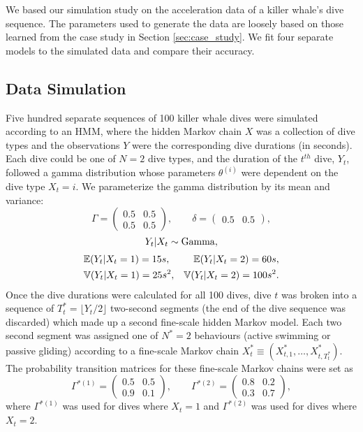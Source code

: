 

We based our simulation study on the acceleration data of a killer whale's dive sequence. The parameters used to generate the data are loosely based on those learned from the case study in Section \ref{sec:case_study}. We fit four separate models to the simulated data and compare their accuracy.

\subsection{Data Simulation}

Five hundred separate sequences of 100 killer whale dives were simulated according to an HMM, where the hidden Markov chain $X$ was a collection of dive types and the observations $Y$ were the corresponding dive durations (in seconds). Each dive could be one of $N=2$ dive types, and the duration of the $t^{th}$ dive, $Y_t$, followed a gamma distribution whose parameters $\theta^{(i)}$ were dependent on the dive type $X_t = i$. We parameterize the gamma distribution by its mean and variance:
%
$$\Gamma = \begin{pmatrix} 0.5 & 0.5 \\ 0.5 & 0.5 \end{pmatrix}, \qquad \delta =  \begin{pmatrix} 0.5 & 0.5 \end{pmatrix},$$
$$Y_t|X_t \sim \rm{Gamma},$$
\begin{align*}
	&\mathbb{E}(Y_t|X_t = 1) = 15 s, &\mathbb{E}(Y_t|X_t = 2) = 60 s, \\
	&\mathbb{V}(Y_t|X_t = 1) = 25 s^2, &\mathbb{V}(Y_t|X_t = 2) = 100 s^2.
\end{align*}
%
Once the dive durations were calculated for all 100 dives, dive $t$ was broken into a sequence of $T^*_t = \lfloor Y_t/2 \rfloor$ two-second segments (the end of the dive sequence was discarded) which made up a second fine-scale hidden Markov model. Each two second segment was assigned one of $N^*=2$ behaviours (active swimming or passive gliding) according to a fine-scale Markov chain $X^*_t \equiv \left(X^*_{t,1}, \ldots, X^*_{t,T^*_t} \right)$. The probability transition matrices for these fine-scale Markov chains were set as
%
$$\Gamma^{*(1)} = \begin{pmatrix} 0.5 & 0.5 \\ 0.9 & 0.1 \end{pmatrix}, \qquad \Gamma^{*(2)} = \begin{pmatrix} 0.8 & 0.2 \\ 0.3 & 0.7 \end{pmatrix},$$ 
%
where $\Gamma^{*(1)}$ was used for dives where $X_t = 1$ and $\Gamma^{*(2)}$ was used for dives where $X_t = 2$. 

